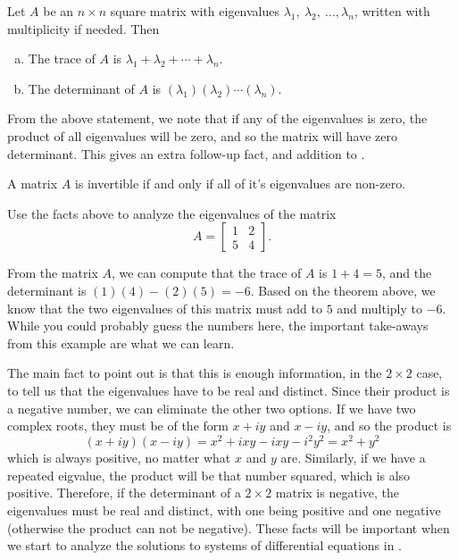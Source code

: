 \begin{theorem}
Let $A$ be an $n \times n$ square matrix with eigenvalues $\lambda_1,\ \lambda_2,\ ..., \lambda_n$, written with multiplicity if needed. Then
\begin{enumerate}[(a)]
\item The trace of $A$ is $\lambda_1 + \lambda_2 + \cdots + \lambda_n$.
\item The determinant of $A$ is $(\lambda_1)(\lambda_2)\cdots(\lambda_n)$.
\end{enumerate}
\end{theorem}

From the above statement, we note that if any of the eigenvalues is zero, the product of all eigenvalues will be zero, and so the matrix will have zero determinant. This gives an extra follow-up fact, and addition to .

\begin{theorem}
A matrix $A$ is invertible if and only if all of it's eigenvalues are non-zero.
\end{theorem}

\begin{example}
Use the facts above to analyze the eigenvalues of the matrix
\begin{equation*}
A = \begin{bmatrix} 1 & 2 \\ 5 & 4 \end{bmatrix}.
\end{equation*}
\end{example}
\begin{exampleSol}
From the matrix $A$, we can compute that the trace of $A$ is $1+4=5$, and the determinant is $(1)(4) - (2)(5) = -6$. Based on the theorem above, we know that the two eigenvalues of this matrix must add to $5$ and multiply to $-6$. While you could probably guess the numbers here, the important take-aways from this example are what we can learn.

The main fact to point out is that this is enough information, in the $2 \times 2$ case, to tell us that the eigenvalues have to be real and distinct. Since their product is a negative number, we can eliminate the other two options. If we have two complex roots, they must be of the form $x + iy$ and $x-iy$, and so the product is 
\begin{equation*}
(x+iy)(x-iy) = x^2 + ixy - ixy  - i^2y^2 = x^2 + y^2
\end{equation*}
which is always positive, no matter what $x$ and $y$ are. Similarly, if we have a repeated eigvalue, the product will be that number squared, which is also positive. Therefore, if the determinant of a $ 2 \times 2$ matrix is negative, the eigenvalues must be real and distinct, with one being positive and one negative (otherwise the product can not be negative). These facts will be important when we start to analyze the solutions to systems of differential equations in .
\end{exampleSol}

